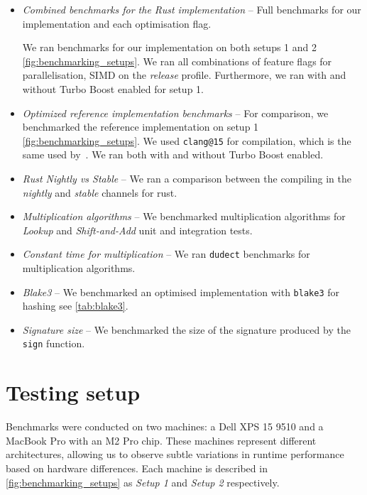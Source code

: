 \documentclass[11pt]{report}
\theoremstyle{definition}
\theoremstyle{plain}
\begin{document}
\begin{itemize}[parsep=0pt, itemsep=3pt]
  \item \textit{Combined benchmarks for the Rust implementation} -- Full benchmarks for our implementation and each optimisation flag.

        We ran benchmarks for our implementation on both setups 1 and 2 \autoref{fig:benchmarking_setups}. We ran all combinations of feature flags for parallelisation, SIMD on the \textit{release} profile. Furthermore, we ran with and without Turbo Boost enabled for setup 1.
  \item \textit{Optimized reference implementation benchmarks} -- For comparison, we benchmarked the reference implementation on setup 1 \autoref{fig:benchmarking_setups}. We used \texttt{clang@15} for compilation, which is the same used by~\cite{aguilarsyndrome11}. We ran both with and without Turbo Boost enabled.
  \item \textit{Rust Nightly vs Stable} -- We ran a comparison between the compiling in the \textit{nightly} and \textit{stable} channels for rust.
  \item \textit{Multiplication algorithms} -- We benchmarked multiplication algorithms for \textit{Lookup} and \textit{Shift-and-Add} unit and integration tests.
  \item \textit{Constant time for multiplication} -- We ran \texttt{dudect} benchmarks for multiplication algorithms.
  \item \textit{Blake3} -- We benchmarked an optimised implementation with \texttt{blake3} for hashing see \autoref{tab:blake3}.
  \item \textit{Signature size} -- We benchmarked the size of the signature produced by the \texttt{sign} function.
\end{itemize}

\section{Testing setup}\label{sub:testing_setup}

Benchmarks were conducted on two machines: a Dell XPS 15 9510 and a MacBook Pro with an M2 Pro chip. These machines represent different architectures, allowing us to observe subtle variations in runtime performance based on hardware differences. Each machine is described in \autoref{fig:benchmarking_setups} as \textit{Setup 1} and \textit{Setup 2} respectively.
\end{document}
